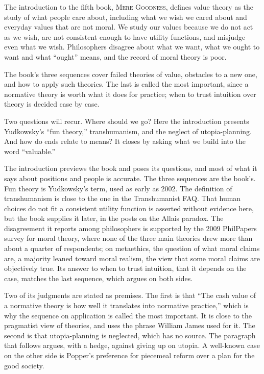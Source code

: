 \begin{afterword}
\summaryhead

The introduction to the fifth book, \textsc{Mere Goodness}, defines value theory as the study of what people care about, including what we wish we cared about and everyday values that are not moral. We study our values because we do not act as we wish, are not consistent enough to have utility functions, and misjudge even what we wish. Philosophers disagree about what we want, what we ought to want and what ``ought'' means, and the record of moral theory is poor.

The book's three sequences cover failed theories of value, obstacles to a new one, and how to apply such theories. The last is called the most important, since a normative theory is worth what it does for practice; when to trust intuition over theory is decided case by case.

Two questions will recur. Where should we go? Here the introduction presents Yudkowsky's ``fun theory,'' transhumanism, and the neglect of utopia-planning. And how do ends relate to means? It closes by asking what we build into the word ``valuable.''

\responsehead

The introduction previews the book and poses its questions, and most of what it says about positions and people is accurate. The three sequences are the book's. Fun theory is Yudkowsky's term, used as early as 2002. The definition of transhumanism is close to the one in the Transhumanist FAQ. That human choices do not fit a consistent utility function is asserted without evidence here, but the book supplies it later, in the posts on the Allais paradox. The disagreement it reports among philosophers is supported by the 2009 PhilPapers survey for moral theory, where none of the three main theories drew more than about a quarter of respondents; on metaethics, the question of what moral claims are, a majority leaned toward moral realism, the view that some moral claims are objectively true. Its answer to when to trust intuition, that it depends on the case, matches the last sequence, which argues on both sides.

Two of its judgments are stated as premises. The first is that ``The cash value of a normative theory is how well it translates into normative practice,'' which is why the sequence on application is called the most important. It is close to the pragmatist view of theories, and uses the phrase William James used for it. The second is that utopia-planning is neglected, which has no source. The paragraph that follows argues, with a hedge, against giving up on utopia. A well-known case on the other side is Popper's preference for piecemeal reform over a plan for the good society.


\end{afterword}
